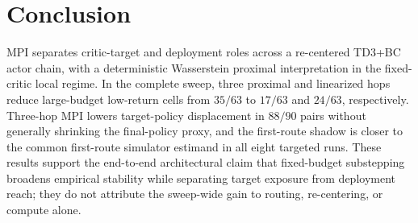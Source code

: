 \section{Conclusion}
\label{sec:conclusion}

MPI separates critic-target and deployment roles across a re-centered TD3+BC actor chain, with a deterministic Wasserstein proximal interpretation in the fixed-critic local regime. In the complete sweep, three proximal and linearized hops reduce large-budget low-return cells from $35/63$ to $17/63$ and $24/63$, respectively. Three-hop MPI lowers target-policy displacement in $88/90$ pairs without generally shrinking the final-policy proxy, and the first-route shadow is closer to the common first-route simulator estimand in all eight targeted runs. These results support the end-to-end architectural claim that fixed-budget substepping broadens empirical stability while separating target exposure from deployment reach; they do not attribute the sweep-wide gain to routing, re-centering, or compute alone.
